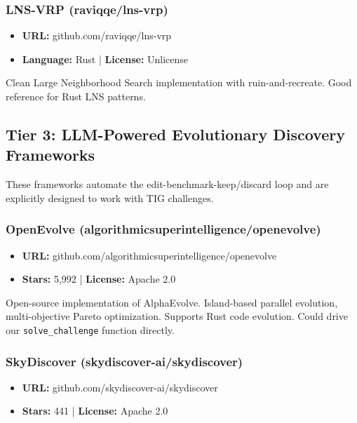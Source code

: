 \documentclass[twocolumn,10pt,letterpaper]{article}
\begin{document}
\subsubsection{LNS-VRP (raviqqe/lns-vrp)}

\begin{itemize}
\setlength{\itemsep}{0pt}
\setlength{\parskip}{0pt}
  \item \textbf{URL:} github.com/raviqqe/lns-vrp
  \item \textbf{Language:} Rust | \textbf{License:} Unlicense
\end{itemize}

Clean Large Neighborhood Search implementation with ruin-and-recreate. Good reference for Rust LNS patterns.


\subsection{Tier 3: LLM-Powered Evolutionary Discovery Frameworks}

These frameworks automate the edit-benchmark-keep/discard loop and are explicitly designed to work with TIG challenges.


\subsubsection{OpenEvolve (algorithmicsuperintelligence/openevolve)}

\begin{itemize}
\setlength{\itemsep}{0pt}
\setlength{\parskip}{0pt}
  \item \textbf{URL:} github.com/algorithmicsuperintelligence/openevolve
  \item \textbf{Stars:} 5,992 | \textbf{License:} Apache 2.0
\end{itemize}

Open-source implementation of AlphaEvolve. Island-based parallel evolution, multi-objective Pareto optimization. Supports Rust code evolution. Could drive our \texttt{solve\_challenge} function directly.


\subsubsection{SkyDiscover (skydiscover-ai/skydiscover)}

\begin{itemize}
\setlength{\itemsep}{0pt}
\setlength{\parskip}{0pt}
  \item \textbf{URL:} github.com/skydiscover-ai/skydiscover
  \item \textbf{Stars:} 441 | \textbf{License:} Apache 2.0
\end{itemize}
\end{document}
